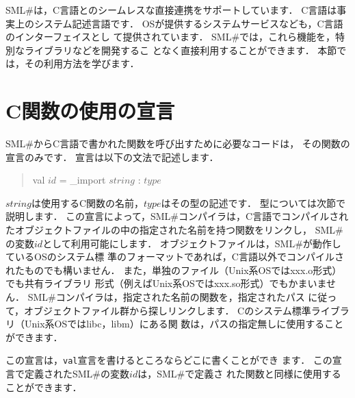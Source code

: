 \documentclass{jbook}
\newcommand{\smlsharp}{SML\#}
\newenvironment{program}{\begin{tt}\begin{quote}}{\end{quote}\end{tt}}
\begin{document}
	\smlsharp{}は，C言語とのシームレスな直接連携をサポートしています．
	C言語は事実上のシステム記述言語です．
	OSが提供するシステムサービスなども，C言語のインターフェイスとし
て提供されています．
	\smlsharp{}では，これら機能を，特別なライブラリなどを開発するこ
となく直接利用することができます．
	本節では，その利用方法を学びます．

\section{C関数の使用の宣言}
\label{sec:extensionCdecl}

	\smlsharp{}からC言語で書かれた関数を呼び出すために必要なコードは，
その関数の宣言のみです．
	宣言は以下の文法で記述します．
\begin{program}
val $id$ = \_import $string$ : $type$
\end{program}
	$string$は使用するC関数の名前，$type$はその型の記述です．
	型については次節で説明します．
	この宣言によって，\smlsharp{}コンパイラは，C言語でコンパイルされ
たオブジェクトファイルの中の指定された名前を持つ関数をリンクし，
\smlsharp{}の変数$id$として利用可能にします．
	オブジェクトファイルは，\smlsharp{}が動作しているOSのシステム標
準のフォーマットであれば，C言語以外でコンパイルされたものでも構いません．
	また，単独のファイル（Unix系OSではxxx.o形式）でも共有ライブラリ
形式（例えばUnix系OSではxxx.so形式）でもかまいません．
	\smlsharp{}コンパイラは，指定された名前の関数を，指定されたパス
に従って，オブジェクトファイル群から探しリンクします．
	Cのシステム標準ライブラリ（Unix系OSではlibc，libm）にある関
数は，パスの指定無しに使用することができます．

	この宣言は，{\tt val}宣言を書けるところならどこに書くことができ
ます．
	この宣言で定義された\smlsharp{}の変数$id$は，\smlsharp{}で定義さ
れた関数と同様に使用することができます．
\end{document}

